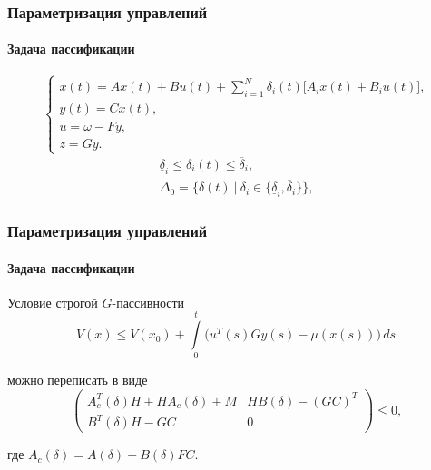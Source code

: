 \documentclass[ignorenonframetext,hyperref={pdftex,unicode},compress,handout]{beamer}
\begin{document}
\begin{frame}
    \frametitle{Параметризация управлений}
    \framesubtitle{Задача пассификации}
    \begin{equation}
        \left\{
            \begin{array}{l}
                \dot{x}(t) = Ax(t) + Bu(t) + \sum\limits_{i=1}^N \delta_i(t)\big[ A_ix(t) + B_iu(t) \big]\mbox{,} \\
                y(t) = Cx(t)\mbox{,} \\
                u = \omega - Fy\mbox{,} \\
                z = Gy\mbox{.}
            \end{array}
        \right.
    \end{equation}
    \begin{eqnarray}
        \underline{\delta}_i \leqslant \delta_i(t) \leqslant \overline{\delta}_i\mbox{,} \\
        \Delta_0 = \big\{ \delta(t)~|~ \delta_i \in \{ \underline{\delta}_i, \overline{\delta}_i \} \big\}\mbox{,}
    \end{eqnarray}
\end{frame}




\begin{frame}
    \frametitle{Параметризация управлений}
    \framesubtitle{Задача пассификации}
    \par Условие \alert{строгой $G$-пассивности}
    \begin{equation}
        V(x) \leqslant V(x_0) + \int\limits_0^t \big( u^T(s)Gy(s) - \mu(x(s)) \big)\,ds
    \end{equation}
    \par можно переписать в виде
    \begin{equation}
        \left(
            \begin{array}{cc}
                A_c^T(\delta)H + HA_c(\delta) + M   &   HB(\delta) - (GC)^T \\
                B^T(\delta)H - GC   &   0
            \end{array}
        \right) \leqslant 0\mbox{,}
    \end{equation}
    \par где $A_c(\delta) = A(\delta) - B(\delta)FC$.
\end{frame}
\end{document}

